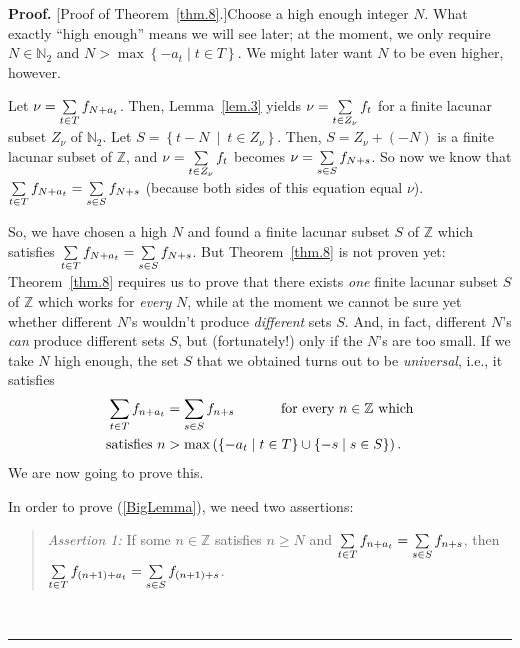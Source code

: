 \documentclass[numbers=enddot,12pt,final,onecolumn,notitlepage]{scrartcl}%
\numberwithin{exer}{section}
\theoremstyle{definition}
\newenvironment{statement}{\begin{quote}}{\end{quote}}
\newenvironment{proof}[1][Proof]{\noindent\textbf{#1.} }{\ \rule{0.5em}{0.5em}}
\let\sumnonlimits\sum
\renewcommand{\sum}{\sumnonlimits\limits}
\begin{document}
\begin{proof}
[Proof of Theorem~\ref{thm.8}.]Choose a high enough integer $N$. What exactly
``high enough'' means we will see later; at the moment, we only require
$N\in\mathbb{N}_{2}$ and $N>\max\left\{  -a_{t}\mid t\in T\right\}  $. We
might later want $N$ to be even higher, however.

Let $\nu=\sum\limits_{t\in T}f_{N+a_{t}}$. Then, Lemma~\ref{lem.3} yields
$\nu=\sum\limits_{t\in Z_{\nu}}f_{t}$ for a finite lacunar subset $Z_{\nu}$ of
$\mathbb{N}_{2}$. Let $S=\left\{  t-N\ \mid\ t\in Z_{\nu}\right\}  $. Then,
$S=Z_{\nu}+\left(  -N\right)  $ is a finite lacunar subset of $\mathbb{Z}$,
and $\nu=\sum\limits_{t\in Z_{\nu}}f_{t}$ becomes $\nu=\sum\limits_{s\in
S}f_{N+s}$. So now we know that $\sum\limits_{t\in T}f_{N+a_{t}}%
=\sum\limits_{s\in S}f_{N+s}$ (because both sides of this equation equal $\nu$).

So, we have chosen a high $N$ and found a finite lacunar subset $S$ of
$\mathbb{Z}$ which satisfies $\sum\limits_{t\in T}f_{N+a_{t}}=\sum
\limits_{s\in S}f_{N+s}$. But Theorem~\ref{thm.8} is not proven yet:
Theorem~\ref{thm.8} requires us to prove that there exists \textit{one} finite
lacunar subset $S$ of $\mathbb{Z}$ which works for \textit{every} $N$, while
at the moment we cannot be sure yet whether different $N$'s wouldn't produce
\textit{different} sets $S$. And, in fact, different $N$'s \textit{can}
produce different sets $S$, but (fortunately!) only if the $N$'s are too
small. If we take $N$ high enough, the set $S$ that we obtained turns out to
be \textit{universal}, i.e., it satisfies
\begin{align}
\sum\limits_{t\in T}f_{n+a_{t}}  &  =\sum\limits_{s\in S}f_{n+s}%
\ \ \ \ \ \ \ \ \ \ \text{for every }n\in\mathbb{Z}\text{ which}\nonumber\\
\text{satisfies }n  &  >\max\left(  \left\{  -a_{t}\mid t\in T\right\}
\cup\left\{  -s\mid s\in S\right\}  \right)  . \label{BigLemma}%
\end{align}
We are now going to prove this.

In order to prove (\ref{BigLemma}), we need two assertions:

\begin{statement}
\textit{Assertion 1:} If some $n\in\mathbb{Z}$ satisfies $n\geq N$ and
$\sum\limits_{t\in T}f_{n+a_{t}}=\sum\limits_{s\in S}f_{n+s}$, then
$\sum\limits_{t\in T}f_{\left(  n+1\right)  +a_{t}}=\sum\limits_{s\in
S}f_{\left(  n+1\right)  +s}$.
\end{statement}


\end{proof}
\end{document}
